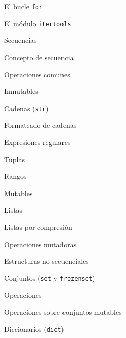 \begin{longenum}
\begin{longenum}
\begin{longenum}
\begin{longenum}
                \item El bucle \texttt{for}
                \item El módulo \texttt{itertools}
            \end{longenum}
        \end{longenum}
        \item Secuencias
        \begin{longenum}
            \item Concepto de secuencia
            \item Operaciones comunes
            \item Inmutables
            \begin{longenum}
                \item Cadenas (\texttt{str})
                \begin{longenum}
                    \item Formateado de cadenas
                    \item Expresiones regulares
                \end{longenum}
                \item Tuplas
                \item Rangos
            \end{longenum}
            \item Mutables
            \begin{longenum}
                \item Listas
                \begin{longenum}
                    \item Listas por compresión
                \end{longenum}
                \item Operaciones mutadoras
            \end{longenum}
        \end{longenum}
        \item Estructuras no secuenciales
        \begin{longenum}
            \item Conjuntos (\texttt{set} y \texttt{frozenset})
            \begin{longenum}
                \item Operaciones
                \item Operaciones sobre conjuntos mutables
            \end{longenum}
            \item Diccionarios (\texttt{dict})

\end{longenum}
\end{longenum}
\end{longenum}
